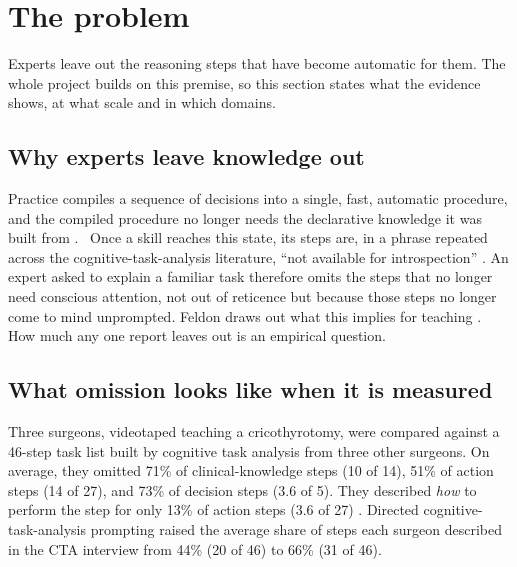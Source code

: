 \section{The problem}
\label{sec:problem}

Experts leave out the reasoning steps that have become automatic for them.
The whole project builds on this premise, so this section states what the
evidence shows, at what scale and in which domains.

\subsection{Why experts leave knowledge out}

Practice compiles a sequence of decisions into a single, fast, automatic
procedure, and the compiled procedure no longer needs the declarative
knowledge it was built from \parencite{anderson1982acquisition}. \evlit\ Once
a skill reaches this state, its steps are, in a phrase repeated across the
cognitive-task-analysis literature, ``not available for introspection''
\parencite[p.~584]{clark2008cognitive}. An expert asked to explain a familiar
task therefore omits the steps that no longer need conscious attention, not
out of reticence but because those steps no longer come to mind unprompted.
Feldon draws out what this implies for teaching
\parencite{feldon2007implications,feldon2007cognitive}. How much any one
report leaves out is an empirical question.

\subsection{What omission looks like when it is measured}

\begin{evlitbox}
  Three surgeons, videotaped teaching a cricothyrotomy, were compared
  against a 46-step task list built by cognitive task analysis from three
  other surgeons. On average, they omitted 71\% of clinical-knowledge steps
  (10 of 14), 51\% of action steps (14 of 27), and 73\% of decision steps
  (3.6 of 5). They described \emph{how} to perform the step for only 13\%
  of action steps (3.6 of 27) \parencite{sullivan2014use}. Directed
  cognitive-task-analysis prompting raised the average share of steps each
  surgeon described in the CTA interview from 44\% (20 of 46) to 66\%
  (31 of 46).
\end{evlitbox}

